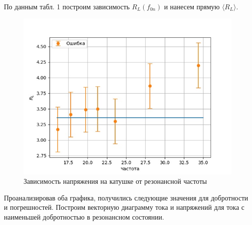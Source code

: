 \documentclass[a4paper, 12pt]{article}
\begin{document}
По данным табл. 1 построим зависимость $R_{L}(f_{0n})$ и нанесем прямую $\langle R_{L} \rangle$. 
\begin{figure}[h!!]
  \begin{center}
    \includegraphics[width = 1\textwidth]{1TaWn49QNAc.jpg}
  \end{center}
  \vspace{-0.5cm}
  \caption{Зависимость напряжения на катушке от резонансной частоты}
\end{figure}
Проанализировав оба графика, получились следующие значения для добротности и погрешностей.
Построим векторную диаграмму тока и напряжений для тока с наименьшей добротностью в резонансном состоянии.
\end{document}
